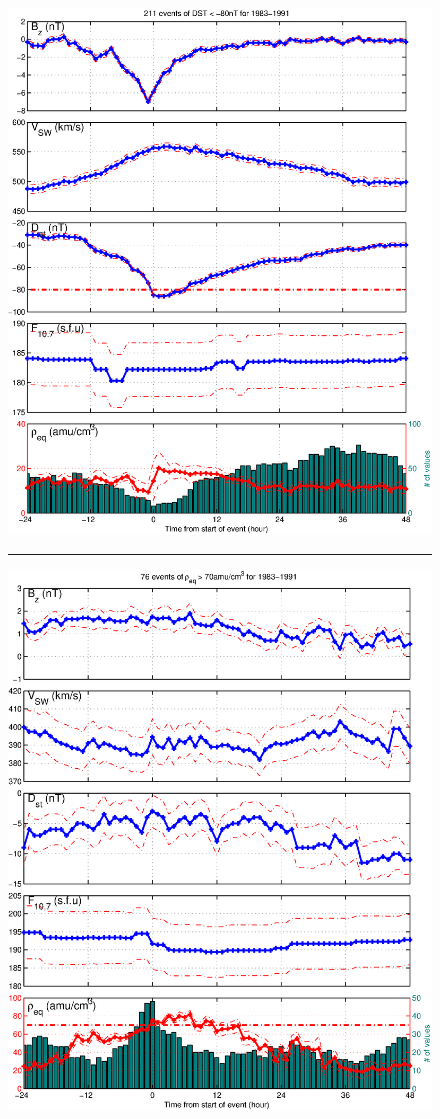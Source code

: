 \documentclass[10pt,twocolumn]{article}
\begin{document}
\begin{figure}[htp!]
\centering
\includegraphics[scale=0.45]{paperfigures/stormavs-d80.eps}
\rule[1ex]{5cm}{0.5pt}
\includegraphics[scale=0.45]{paperfigures/stormavs-m70.eps}

\end{figure}
\end{document}
